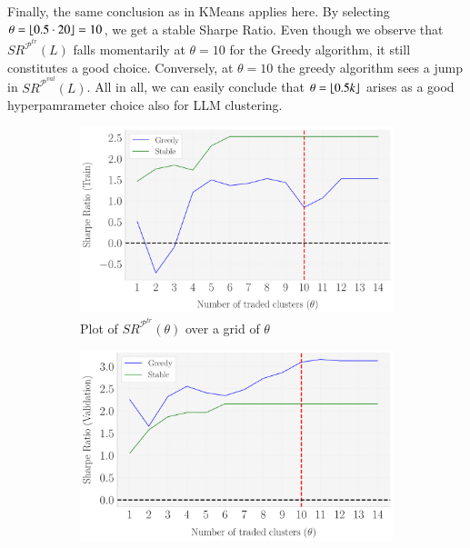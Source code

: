 Finally, the same conclusion as in KMeans applies here. By selecting $\theta=\lfloor 0.5\cdot 20 \rfloor=10$, we get a stable Sharpe Ratio. Even though we observe that $SR^{\mathcal P^{tr}}(L)$ falls momentarily at $\theta=10$ for the Greedy algorithm, it still constitutes a good choice. Conversely, at $\theta=10$ the greedy algorithm sees a jump in $SR^{\mathcal P^{val}}(L)$. All in all, we can easily conclude that $\theta=\lfloor 0.5k \rfloor$ arises as a good hyperpamrameter choice also for LLM clustering.
\begin{figure}[H]
\caption{Sharpe Ratios in the train and validation splits as a function of $\theta$ (LLM)}
  \centering

    \begin{subfigure}[b]{0.46\textwidth}
    \centering
    \includegraphics[width=\textwidth]{fig_LLAMA_RobustnessCheck_SR_Train_Set_vs_Theta_[Change_theta].pdf}
    \caption{Plot of $SR^{\mathcal P^{tr}}(\theta)$ over a grid of $\theta$}
    \label{fig:LLM_hyp_3}
  \end{subfigure}
  \hspace{0.05\textwidth} %
  \begin{subfigure}[b]{0.46\textwidth}
    \centering
    \includegraphics[width=\textwidth]{fig_LLAMA_RobustnessCheck_SR_Validation_Set_vs_Theta_[Change_theta].pdf}

\end{subfigure}
\end{figure}
